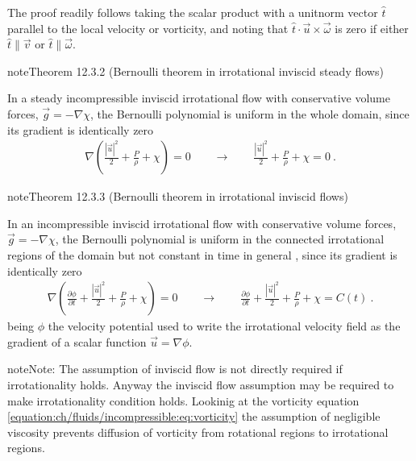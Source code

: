 \documentclass[letterpaper,10pt,english]{jupyterBook}
\begin{document}
\sphinxAtStartPar
The proof readily follows taking the scalar product with a unit\sphinxhyphen{}norm vector \(\hat{t}\) parallel to the local velocity or vorticity, and noting that \(\hat{t} \cdot \vec{u} \times \vec{\omega}\) is zero if either \(\hat{t} \parallel \vec{v}\) or \(\hat{t} \parallel \vec{\omega}\).
\label{ch/fluids/incompressible:theorem-1}
\begin{sphinxadmonition}{note}{Theorem 12.3.2 (Bernoulli theorem in irrotational inviscid steady flows)}



\sphinxAtStartPar
In a steady incompressible inviscid irrotational flow with conservative volume forces, \(\vec{g} = - \nabla \chi\), the Bernoulli polynomial is uniform in the whole domain, since its gradient is identically zero
\begin{equation*}
\begin{split}\nabla \left( \frac{|\vec{u}|^2}{2} + \frac{P}{\rho} + \chi \right) = 0 
\qquad \rightarrow \qquad \frac{|\vec{u}|^2}{2} + \frac{P}{\rho} + \chi = 0 \ .\end{split}
\end{equation*}\end{sphinxadmonition}
\label{ch/fluids/incompressible:theorem-2}
\begin{sphinxadmonition}{note}{Theorem 12.3.3 (Bernoulli theorem in irrotational inviscid flows)}



\sphinxAtStartPar
In an incompressible inviscid irrotational flow with conservative volume forces, \(\vec{g} = - \nabla \chi\), the Bernoulli polynomial is uniform in the connected irrotational regions of the domain \sphinxhyphen{} but not constant in time in general \sphinxhyphen{} , since its gradient is identically zero
\begin{equation*}
\begin{split}\nabla \left( \frac{\partial \phi}{\partial t} + \frac{|\vec{u}|^2}{2} + \frac{P}{\rho} + \chi \right) = 0 
\qquad \rightarrow \qquad \frac{\partial \phi}{\partial t} + \frac{|\vec{u}|^2}{2} + \frac{P}{\rho} + \chi = C(t) \ .\end{split}
\end{equation*}
\sphinxAtStartPar
being \(\phi\) the velocity potential used to write the irrotational velocity field as the gradient of a scalar function \(\vec{u} = \nabla \phi\).
\end{sphinxadmonition}

\begin{sphinxadmonition}{note}{Note:}
\sphinxAtStartPar
The assumption of inviscid flow is not directly required if irrotationality holds. Anyway the inviscid flow assumption may be required to make irrotationality condition holds. Lookinig at the vorticity equation \eqref{equation:ch/fluids/incompressible:eq:vorticity} the assumption of negligible viscosity prevents diffusion of vorticity from rotational regions to irrotational regions.
\end{sphinxadmonition}
\end{document}
